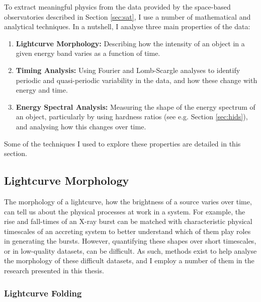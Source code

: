 \par To extract meaningful physics from the data provided by the space-based observatories described in Section \ref{sec:sat}, I use a number of mathematical and analytical techniques.  In a nutshell, I analyse three main properties of the data:
\begin{enumerate}
\item \textbf{Lightcurve Morphology:} Describing how the intensity of an object in a given energy band varies as a function of time.
\item \textbf{Timing Analysis:} Using Fourier and Lomb-Scargle analyses to identify periodic and quasi-periodic variability in the data, and how these change with energy and time.
\item \textbf{Energy Spectral Analysis:} Measuring the shape of the energy spectrum of an object, particularly by using hardness ratios (see e.g. Section \ref{sec:hids}), and analysing how this changes over time.
\end{enumerate}
\par Some of the techniques I used to explore these properties are detailed in this section.

\subsection{Lightcurve Morphology}

\label{sec:LCMorph}

\par The morphology of a lightcurve, how the brightness of a source varies over time, can tell us about the physical processes at work in a system.  For example, the rise and fall-times of an X-ray burst can be matched with characteristic physical timescales of an accreting system to better understand which of them play roles in generating the bursts.  However, quantifying these shapes over short timescales, or in low-quality datasets, can be difficult.  As such, methods exist to help analyse the morphology of these difficult datasets, and I employ a number of them in the research presented in this thesis.

\subsubsection{Lightcurve Folding}


